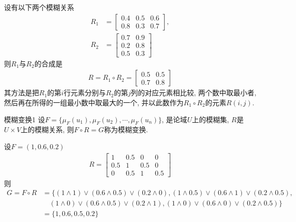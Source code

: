 {%
\begin{example}
设有以下两个模糊关系
\begin{align*}
  R_{1}&=\left[\begin{array}{ccc}{0.4} & {0.5} & {0.6} \\ {0.8} & {0.3} & {0.7}\end{array}\right],\\
  R_{2}&=\left[\begin{array}{cc}{0.7} & {0.9} \\ {0.2} & {0.8} \\ {0.5} & {0.3}\end{array}\right]
\end{align*}
则$R_1$与$R_2$的合成是
\begin{align}
  R=R_{1} \circ R_{2}=\left[\begin{array}{ll}{0.5} & {0.5} \\ {0.7} & {0.8}\end{array}\right]
\end{align}
其方法是把$R_1$的第$i$行元素分别与$R_2$的第$j$列的对应元素相比较, 两个数中取最小者, 然后再在所得的一组最小数中取最大的一个, 并以此数作为$R_1\circ R_2$的元素$R(i,j)$.
\end{example}
\begin{mydef}{模糊变换}{1}
设$F=\{\mu_F(u_1),\mu_F(u_2),\cdots, \mu_F(u_n)\}$, 是论域$U$上的模糊集, $R$是$U\times V$上的模糊关系, 则$F\circ R=G$称为模糊变换.
\end{mydef}
\begin{example}
设$F=(1, 0.6, 0.2)$
\begin{align}
  R=\left[\begin{array}{cccc}
  {1} & {0.5} & {0} & {0} \\
  {0.5} & {1} & {0.5} & {0} \\
  {0} & {0.5} & {1} & {0.5}
  \end{array}\right]
\end{align}
则
\begin{align*}
  G=F\circ R&=\{(1\wedge 1)\vee (0.6\wedge 0.5)\vee (0.2\wedge 0), (1\wedge 0.5)\vee (0.6\wedge 1)\vee (0.2\wedge 0.5),\\
    &\quad  (1\wedge 0)\vee (0.6\wedge 0.5)\vee (0.2\wedge 1), (1\wedge 0)\vee (0.6\wedge 0)\vee (0.2\wedge 0.5)\}\\
        & =\{1, 0.6, 0.5, 0.2\}
\end{align*}
\end{example}
}
